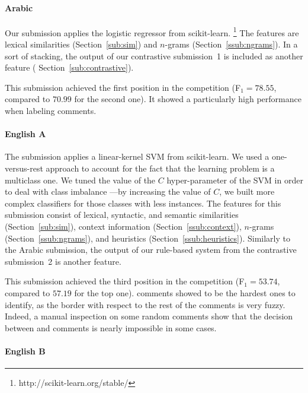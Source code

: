 \paragraph{Arabic} 
Our submission applies the logistic regressor from scikit-learn.%
\footnote{http://scikit-learn.org/stable/}
The features are lexical similarities (Section~\ref{sub:sim}) and  $n$-grams 
(Section~\ref{ssub:ngrams}). In a sort of stacking, the output of our 
contrastive submission~1 is included as another feature (\cf 
Section~\ref{sub:contrastive}). 

This submission achieved the first position in the competition (F$_1=78.55$, 
compared to $70.99$ for the second one). It showed a particularly high 
performance when labeling \rel comments.

\paragraph{English A}
The submission applies a linear-kernel SVM from scikit-learn. We used a 
one-versus-rest approach to account for the fact that the learning problem is a 
multiclass one. We tuned the value of the $C$ hyper-parameter of the SVM in 
order to deal with class imbalance ---by increasing the value of $C$, we built 
more complex classifiers for those classes with less instances. The features for 
this submission consist of lexical, syntactic, and semantic similarities 
(Section~\ref{sub:sim}), context information (Section~\ref{ssub:context}), 
$n$-grams (Section~\ref{ssub:ngrams}), and heuristics 
(Section~\ref{ssub:heuristics}). Similarly to the Arabic submission, the output 
of our rule-based system from the contrastive submission~2 is another feature. 

This submission achieved the third position in the competition (F$_1=53.74$, 
compared to $57.19$ for the top one). \pot comments showed to be the 
hardest ones to identify, as the border with respect to the rest of the comments 
is very fuzzy. Indeed, a manual inspection on some random comments show that the 
decision between \good and \pot comments is nearly impossible in some cases.

\paragraph{English B}

